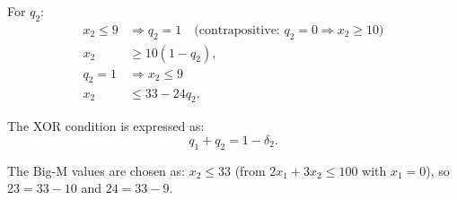 \documentclass{article}
\begin{document}
\begin{enumerate}
For $q_2$:
\begin{align*}
x_2 \leq 9 &\Rightarrow q_2 = 1 \quad \text{(contrapositive: } q_2 = 0 \Rightarrow x_2 \geq 10\text{)} \\
x_2 &\geq 10(1-q_2), \\
q_2 = 1 &\Rightarrow x_2 \leq 9 \\
x_2 &\leq 33 - 24q_2.
\end{align*}

The XOR condition is expressed as:
\[
q_1 + q_2 = 1 - \delta_2.
\]

The Big-M values are chosen as: $x_2 \leq 33$ (from $2x_1 + 3x_2 \leq 100$ with $x_1 = 0$), so $23 = 33 - 10$ and $24 = 33 - 9$.
%
%

\end{enumerate}
\end{document}
